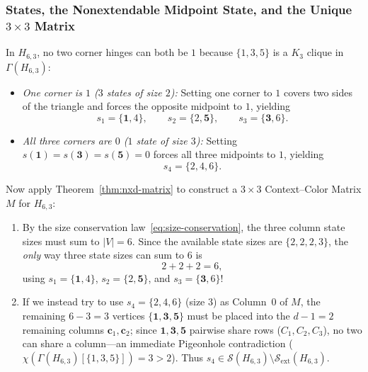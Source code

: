 \documentclass[aps,pra,reprint,superscriptaddress,longbibliography,nofootinbib,floatfix,10pt]{revtex4-2}
\theoremstyle{definition}\newtheorem{definition}[theorem]{Definition}
\theoremstyle{remark}\newtheorem{remark}[theorem]{Remark}
\newcommand{\Sc}{\mathcal S}\newcommand{\Cc}{\mathcal C}
\begin{document}
\subsubsection{States, the Nonextendable Midpoint State, and the Unique \texorpdfstring{$3\times 3$}{3x3} Matrix}
In $H_{6,3}$, no two corner hinges can both be $1$ because $\{1,3,5\}$ is a $K_3$ clique in $\Gamma(H_{6,3})$:
\begin{itemize}
\item \emph{One corner is $1$ ($3$ states of size $2$):} Setting one corner to $1$ covers two sides of the triangle and forces the opposite midpoint to $1$, yielding
\[
s_1=\{\mathbf{1},4\},\qquad s_2=\{2,\mathbf{5}\},\qquad s_3=\{\mathbf{3},6\}.
\]
\item \emph{All three corners are $0$ ($1$ state of size $3$):} Setting $s(\mathbf{1})=s(\mathbf{3})=s(\mathbf{5})=0$ forces all three midpoints to $1$, yielding
\[
s_4=\{2,4,6\}.
\]
\end{itemize}
Now apply Theorem~\ref{thm:nxd-matrix} to construct a $3\times 3$ Context--Color Matrix $M$ for $H_{6,3}$:
\begin{enumerate}
\item By the size conservation law~\eqref{eq:size-conservation}, the three column state sizes must sum to $|V|=6$. Since the available state sizes are $\{2,2,2,3\}$, the \emph{only} way three state sizes can sum to $6$ is
\[
2+2+2=6,
\]
using $s_1=\{\mathbf{1},4\}$, $s_2=\{2,\mathbf{5}\}$, and $s_3=\{\mathbf{3},6\}$!
\item If we instead try to use $s_4=\{2,4,6\}$ (size $3$) as Column~0 of $M$, the remaining $6-3=3$ vertices $\{\mathbf{1},\mathbf{3},\mathbf{5}\}$ must be placed into the $d-1=2$ remaining columns $\mathbf{c}_1,\mathbf{c}_2$; since $\mathbf{1},\mathbf{3},\mathbf{5}$ pairwise share rows ($C_1,C_2,C_3$), no two can share a column—an immediate Pigeonhole contradiction ($\chi(\Gamma(H_{6,3})[\{1,3,5\}])=3>2$). Thus $s_4\in\Sc(H_{6,3})\setminus\Sc_{\mathrm{ext}}(H_{6,3})$.
\end{enumerate}
\end{document}
